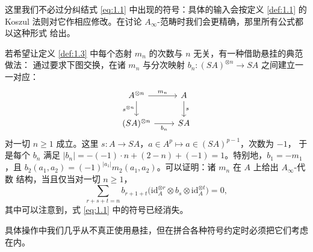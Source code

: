 这里我们不必过分纠结式 \eqref{eq:1.1} 中出现的符号：具体的输入会按定义 \ref{def:1.1} 的
Koszul 法则对它作相应修改。在讨论 $A_\infty$-范畴时我们会更精确，那里所有公式都以这种形式
给出。

\begin{Rem}\label{rem:1.4}
若希望让定义 \ref{def:1.3} 中每个态射 $m_n$ 的次数与 $n$ 无关，有一种借助悬挂的典范做法：
通过要求下图交换，在诸 $m_n$ 与分次映射 $b_n:(SA)^{\otimes n}\to SA$ 之间建立一一对应：
\[
  \begin{tikzcd}
    A^{\otimes n} \arrow[r,"m_n"] \arrow[d,"s^{\otimes n}"'] & A \arrow[d,"s"] \\
    (SA)^{\otimes n} \arrow[r,"b_n"'] & SA
  \end{tikzcd}
\]
对一切 $n\ge 1$ 成立。这里 $s:A\to SA$，$a\in A^p\mapsto a\in(SA)^{p-1}$，次数为 $-1$，
于是每个 $b_n$ 满足 $|b_n|=-(-1)\cdot n+(2-n)+(-1)=1$。特别地，$b_1=-m_1$，且
$b_2(a_1,a_2)=(-1)^{|a_1|}m_2(a_1,a_2)$。可以证明：诸 $m_n$ 在 $A$ 上给出 $A_\infty$-代数
结构，当且仅当对一切 $n\ge 1$，
\[
  \sum_{r+s+t=n}b_{r+1+t}
  \bigl(\mathrm{id}_A^{\otimes r}\otimes b_s\otimes\mathrm{id}_A^{\otimes t}\bigr)=0 ,
\]
其中可以注意到，式 \eqref{eq:1.1} 中的符号已经消失。

具体操作中我们几乎从不真正使用悬挂，但在拼合各种符号约定时必须把它们考虑在内。
\end{Rem}


